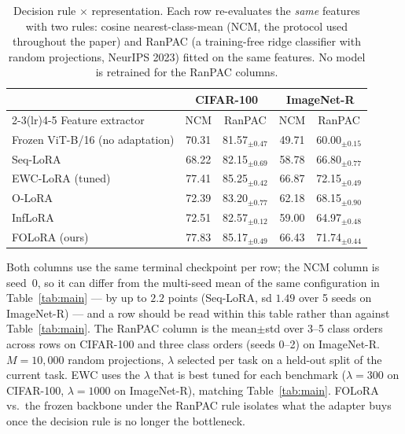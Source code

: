 \begin{table}[htbp]
\centering
\small
\setlength{\tabcolsep}{4pt}
\caption{Decision rule $\times$ representation. Each row re-evaluates the \emph{same} features with two rules: cosine nearest-class-mean (NCM, the protocol used throughout the paper) and RanPAC (a training-free ridge classifier with random projections, NeurIPS 2023) fitted on the same features. No model is retrained for the RanPAC columns.}
\label{tab:posthoc}
\begin{tabular}{lcccc}
\toprule
 & \multicolumn{2}{c}{CIFAR-100} & \multicolumn{2}{c}{ImageNet-R} \\
\cmidrule(lr){2-3}\cmidrule(lr){4-5}
Feature extractor & NCM & RanPAC & NCM & RanPAC \\
\midrule
Frozen ViT-B/16 (no adaptation) & 70.31 & 81.57$_{\pm 0.47}$ & 49.71 & 60.00$_{\pm 0.15}$ \\
Seq-LoRA & 68.22 & 82.15$_{\pm 0.69}$ & 58.78 & 66.80$_{\pm 0.77}$ \\
EWC-LoRA (tuned) & 77.41 & 85.25$_{\pm 0.42}$ & 66.87 & 72.15$_{\pm 0.49}$ \\
O-LoRA & 72.39 & 83.20$_{\pm 0.77}$ & 62.18 & 68.15$_{\pm 0.90}$ \\
InfLoRA & 72.51 & 82.57$_{\pm 0.12}$ & 59.00 & 64.97$_{\pm 0.48}$ \\
FOLoRA (ours) & 77.83 & 85.17$_{\pm 0.49}$ & 66.43 & 71.74$_{\pm 0.44}$ \\
\bottomrule
\end{tabular}
\par\vspace{1pt}
\footnotesize
Both columns use the same terminal checkpoint per row; the NCM column is seed~0, so it can differ from the multi-seed mean of the same configuration in Table~\ref{tab:main} --- by up to $2.2$ points (Seq-LoRA, sd $1.49$ over 5 seeds on ImageNet-R) --- and a row should be read within this table rather than against Table~\ref{tab:main}. The RanPAC column is the mean$\pm$std over 3--5 class orders across rows on CIFAR-100 and three class orders (seeds 0--2) on ImageNet-R. $M{=}10{,}000$ random projections, $\lambda$ selected per task on a held-out split of the current task. EWC uses the $\lambda$ that is best tuned for each benchmark ($\lambda{=}300$ on CIFAR-100, $\lambda{=}1000$ on ImageNet-R), matching Table~\ref{tab:main}. FOLoRA vs.\ the frozen backbone under the RanPAC rule isolates what the adapter buys once the decision rule is no longer the bottleneck.
\end{table}
